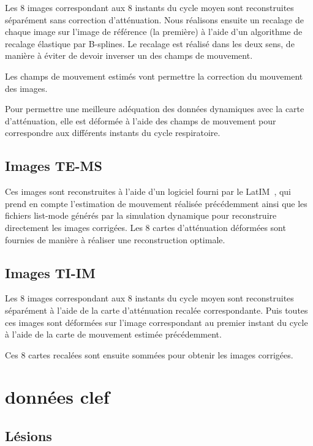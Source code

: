 Les 8 images correspondant aux 8 instants du cycle moyen sont reconstruites séparément sans correction d'atténuation. Nous réalisons ensuite un recalage de chaque image sur l'image de référence (la première) à l'aide d'un algorithme de recalage élastique par B-splines. Le recalage est réalisé dans les deux sens, de manière à éviter de devoir inverser un des champs de mouvement.

Les champs de mouvement estimés vont permettre la correction du mouvement des images. 

Pour permettre une meilleure adéquation des données dynamiques avec la carte d'atténuation, elle est déformée à l'aide des champs de mouvement pour correspondre aux différents instants du cycle respiratoire.

\subsection{Images TE-MS}

Ces images sont reconstruites à l'aide d'un logiciel fourni par le LatIM~\cite{lamare2007list}, qui prend en compte l'estimation de mouvement réalisée précédemment ainsi que les fichiers list-mode générés par la simulation dynamique pour reconstruire directement les images corrigées. Les 8 cartes d'atténuation déformées sont fournies de manière à réaliser une reconstruction optimale.

\subsection{Images TI-IM}

Les 8 images correspondant aux 8 instants du cycle moyen sont reconstruites séparément à l'aide de la carte d'atténuation recalée correspondante. Puis toutes ces images sont déformées sur l'image correspondant au premier instant du cycle à l'aide de la carte de mouvement estimée précédemment.

Ces 8 cartes recalées sont ensuite sommées pour obtenir les images corrigées.


	\section{données clef} %

\subsection{Lésions}

